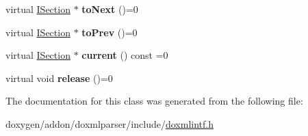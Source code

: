 \begin{DoxyCompactItemize}
virtual \mbox{\hyperlink{class_i_section}{I\+Section}} $\ast$ {\bfseries to\+Next} ()=0
\item 
\mbox{\label{class_i_section_iterator_af43d4541086f11c27a1a640573e17aa6}} 
virtual \mbox{\hyperlink{class_i_section}{I\+Section}} $\ast$ {\bfseries to\+Prev} ()=0
\item 
\mbox{\label{class_i_section_iterator_af11fad13d99d1f7de5dd7499bda5fa66}} 
virtual \mbox{\hyperlink{class_i_section}{I\+Section}} $\ast$ {\bfseries current} () const =0
\item 
\mbox{\label{class_i_section_iterator_a5a3cd47ee8110b6bd1379d2b8f7ccfef}} 
virtual void {\bfseries release} ()=0
\end{DoxyCompactItemize}


The documentation for this class was generated from the following file\+:\begin{DoxyCompactItemize}
\item 
doxygen/addon/doxmlparser/include/\mbox{\hyperlink{include_2doxmlintf_8h}{doxmlintf.\+h}}\end{DoxyCompactItemize}
